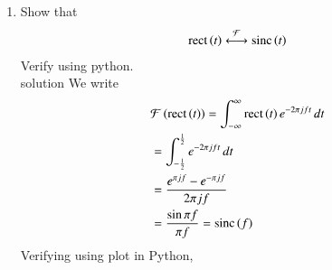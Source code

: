 \documentclass[journal,12pt,twocolumn]{IEEEtran}
\renewcommand\thesection{\arabic{section}}
\begin{document}
\begin{enumerate}[label=\thesection.\arabic*
,ref=\thesection.\theenumi]
\item Show that 
\begin{align}
\text{rect}\left(t\right) \overset{\mathcal{F}}{ \longleftrightarrow} \text{sinc}\left(t\right)
\end{align}
Verify using python. \\
\solution
solution We write
\begin{align}
	&\mathcal{F}\left(\text{rect}\left(t\right)\right) = \int_{-\infty}^{\infty}\text{rect}\left(t\right)e^{-2\pi jft}\, dt \\
            &=\int_{-\frac{1}{2}}^{\frac{1}{2}}e^{-2\pi jft}\, dt \\
            &=\frac{e^{\pi jf} - e^{-\pi jf}}{2\pi jf} \\
	    &= \frac{\sin{\pi f}}{\pi f} = \text{sinc}\left(f\right)
            \label{eq:fourier-rect}
\end{align}
Verifying using plot in Python,



\end{enumerate}
\end{document}
